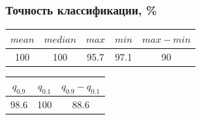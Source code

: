 \documentclass{beamer}
\begin{document}
	\begin{frame} 
		\frametitle{Точность классификации, \%}
		\vspace{1cm}
		
		\begin{table}
			\begin{tabular}{ccccc}
				$mean$ & $median$ & $max$ & $min$ & $max - min$ \\ \hline
				100 & 100 & 95.7 & 97.1 & 90
			\end{tabular}
		\end{table}
	
		\begin{table}
			\begin{tabular}{ccc}
				$q_{0.9}$ & $q_{0.1}$ & $q_{0.9} - q_{0.1}$ \\ \hline
				98.6 & 100 & 88.6
			\end{tabular}
		\end{table}
	
	
		

	\end{frame}
		
		
\end{document}
